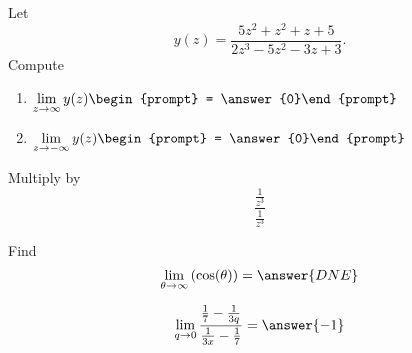 \documentclass[handout]{ximera}
\begin{document}
\begin{exercise}
Let 
\[
y(z) = \frac{5 z^2+z^2+z+5}{2 z^3-5 z^2-3 z+3}.
\]
Compute
\begin{enumerate}
\item $\displaystyle\lim_{z\to \infty} y(z) \begin{prompt} = \answer{0}\end{prompt}$
\item $\displaystyle\lim_{z\to -\infty}y(z) \begin{prompt} = \answer{0}\end{prompt}$
\end{enumerate}
\begin{hint}
Multiply by
\[
\frac{\frac{1}{z^3}}{\frac{1}{z^3}}
\]
\end{hint}
\end{exercise}

\begin{exercise}
Find
\[
\lim_{\theta\to\infty}\left(\cos(\theta)\right)
= \answer{DNE}
\]
\end{exercise}

\begin{exercise}
\[\lim_{q \to 0} \frac{\frac{1}{7}-\frac{1}{3q}}{\frac{1}{3x}-\frac{1}{7}} = \answer{-1}\]
\end{exercise}
\end{document}

